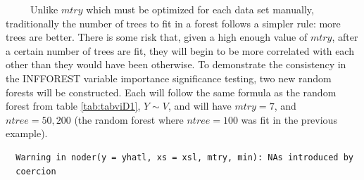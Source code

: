 \documentclass[12pt,twoside]{reedthesis}
\begin{document}
  ~~~~~Unlike \(mtry\) which must be optimized for each data set manually,
  traditionally the number of trees to fit in a forest follows a simpler
  rule: more trees are better. There is some risk that, given a high
  enough value of \(mtry\), after a certain number of trees are fit, they
  will begin to be more correlated with each other than they would have
  been otherwise. To demonstrate the consistency in the INFFOREST variable
  importance significance testing, two new random forests will be
  constructed. Each will follow the same formula as the random forest from
  table \ref{tab:tabviD1}, \(Y \sim V\), and will have \(mtry = 7\), and
  \(ntree = 50, 200\) (the random forest where \(ntree = 100\) was fit in
  the previous example).
  
  \begin{verbatim}
  Warning in noder(y = yhatl, xs = xsl, mtry, min): NAs introduced by
  coercion
  \end{verbatim}
  
\end{document}

